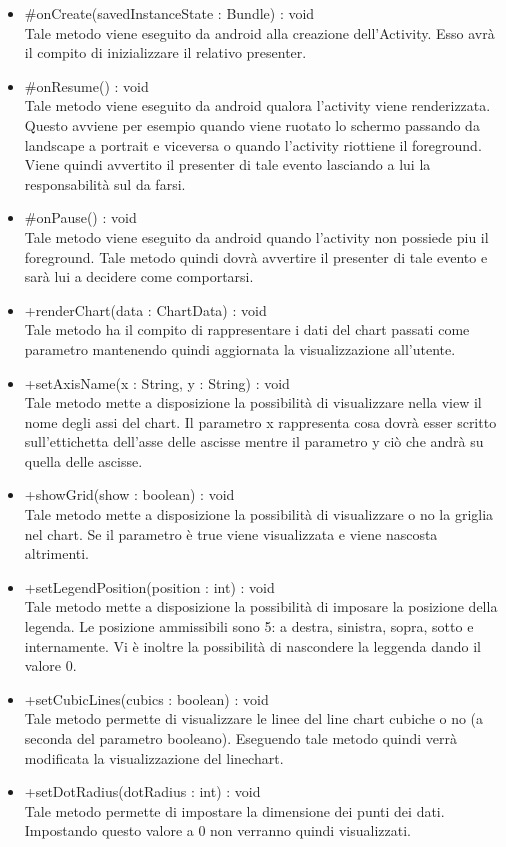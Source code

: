 \begin{itemize}
\begin{itemize}
					\item[\ding{111}] {{\#onCreate(savedInstanceState : Bundle) : void}} \\ [1mm] Tale metodo viene eseguito da android alla creazione dell'Activity. Esso avrà il compito di inizializzare il relativo presenter. 
					\item[\ding{111}] {{\#onResume() : void}} \\ [1mm] Tale metodo viene eseguito da android qualora l'activity viene renderizzata. Questo avviene per esempio quando viene ruotato lo schermo passando da landscape a portrait e viceversa o quando l'activity riottiene il foreground. Viene quindi avvertito il presenter di tale evento lasciando a lui la responsabilità sul da farsi.
					\item[\ding{111}] {{\#onPause() : void}} \\ [1mm] Tale metodo viene eseguito da android quando l'activity non possiede piu il foreground. Tale metodo quindi dovrà avvertire il presenter di tale evento e sarà lui a decidere come comportarsi.
					\item[\ding{111}] {{+renderChart(data : ChartData) : void}} \\ [1mm] Tale metodo ha il compito di rappresentare i dati del chart passati come parametro mantenendo quindi aggiornata la visualizzazione all'utente.
					\item[\ding{111}] {{+setAxisName(x : String, y : String) : void}} \\ [1mm] Tale metodo mette a disposizione la possibilità di visualizzare nella view il nome degli assi del chart. Il parametro x rappresenta cosa dovrà esser scritto sull'ettichetta dell'asse delle ascisse mentre il parametro y ciò che andrà su quella delle ascisse.
					\item[\ding{111}] {{+showGrid(show : boolean) : void}} \\ [1mm] Tale metodo mette a disposizione la possibilità di visualizzare o no la griglia nel chart. Se il parametro è true viene visualizzata e viene nascosta altrimenti.
					\item[\ding{111}] {{+setLegendPosition(position : int) : void}} \\ [1mm] Tale metodo mette a disposizione la possibilità di imposare la posizione della legenda. Le posizione ammissibili sono 5: a destra, sinistra, sopra, sotto e internamente. Vi è inoltre la possibilità di nascondere la leggenda dando il valore 0.
					\item[\ding{111}] {{+setCubicLines(cubics : boolean) : void}} \\ [1mm] Tale metodo permette di visualizzare le linee del line chart cubiche o no (a seconda del parametro booleano). Eseguendo tale metodo quindi verrà modificata la visualizzazione del linechart.
					\item[\ding{111}] {{+setDotRadius(dotRadius : int) : void}} \\ [1mm] Tale metodo permette di impostare la dimensione dei punti dei dati. Impostando questo valore a 0 non verranno quindi visualizzati.
				\end{itemize}
		
			\end{itemize}

